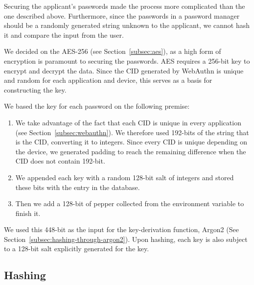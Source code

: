 Securing the applicant's passwords made the process more complicated than the
one described above.
Furthermore, since the passwords in a password manager should be a randomly
generated string unknown to the applicant, we cannot hash it and compare the
input from the user.

We decided on the AES-256 (see Section~\ref{subsec:aes}), as a high form of
encryption is paramount to securing the passwords.
AES requires a 256-bit key to encrypt and decrypt the data.
Since the CID generated by WebAuthn is unique and random for each application
and device, this serves as a basis for constructing the key.

We based the key for each password on the following premise:
\begin{enumerate}
  \item
  We take advantage of the fact that each CID is unique in every application
  (see Section~\ref{subsec:webauthn}).
  We therefore used 192-bits of the string that is the CID\@, converting it to
  integers.
  Since every CID is unique depending on the device, we generated padding to
  reach the remaining difference when the CID does not contain 192-bit.
  \item
  We appended each key with a random 128-bit salt of integers and stored these
  bits with the entry in the database.
  \item
  Then we add a 128-bit of pepper collected from the environment variable to
  finish it.
\end{enumerate}
We used this 448-bit as the input for the key-derivation function,
Argon2 (See Section~\ref{subsec:hashing-through-argon2}).
Upon hashing, each key is also subject to a 128-bit salt explicitly generated
for the key.

\subsection{Hashing}\label{subsec:hashing}

